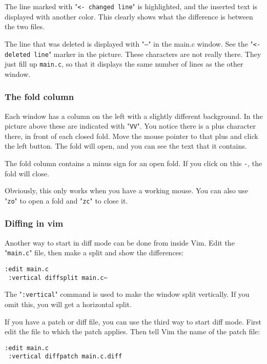 The line marked with "\texttt{<- changed line}" is highlighted, and the inserted text is displayed with another color.
This clearly shows what the difference is between the two files.

The line that was deleted is displayed with "\texttt{---}" in the main.c window.
See the "\texttt{<- deleted line}" marker in the picture.
These characters are not really there.
They just fill up \texttt{main.c}, so that it displays the same number of lines as the other window.

\subsubsection{The fold column}
Each window has a column on the left with a slightly different background.
In the picture above these are indicated with "\texttt{VV}".
You notice there is a plus character there, in front of each closed fold.
Move the mouse pointer to that plus and click the left button.
The fold will open, and you can see the text that it contains.

The fold column contains a minus sign for an open fold.
If you click on this \texttt{-}, the fold will close.

Obviously, this only works when you have a working mouse.
You can also use "\texttt{zo}" to open a fold and "\texttt{zc}" to close it.

\subsubsection{Diffing in vim}
Another way to start in diff mode can be done from inside Vim.
Edit the "\texttt{main.c}" file, then make a split and show the differences:

 \begin{Verbatim}[samepage=true]
 :edit main.c
 :vertical diffsplit main.c~ 
 \end{Verbatim}

The "\texttt{:vertical}" command is used to make the window split vertically.
If you omit this, you will get a horizontal split.

If you have a patch or diff file, you can use the third way to start diff mode.
First edit the file to which the patch applies.
Then tell Vim the name of the patch file:

 \begin{Verbatim}[samepage=true]
 :edit main.c
 :vertical diffpatch main.c.diff
 \end{Verbatim}

